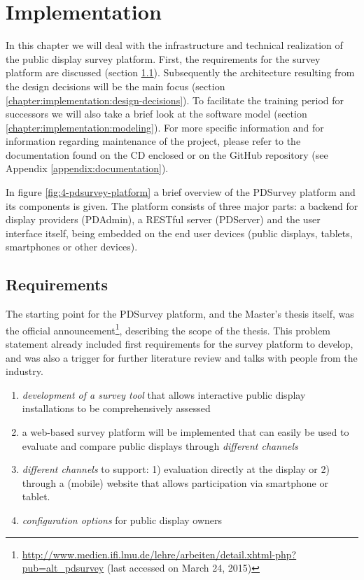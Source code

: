 \section{Implementation}
\label{chapter:implementation}

	In this chapter we will deal with the infrastructure and technical realization of the public display survey platform. First, the requirements for the survey platform are discussed (section \ref{chapter:implementation:requirements}). Subsequently the architecture resulting from the design decisions will be the main focus (section \ref{chapter:implementation:design-decisions}). To facilitate the training period for successors we will also take a brief look at the software model (section \ref{chapter:implementation:modeling}). For more specific information and for information regarding maintenance of the project, please refer to the documentation found on the CD enclosed or on the GitHub repository (see Appendix \ref{appendix:documentation}).

	In figure \ref{fig:4-pdsurvey-platform} a brief overview of the PDSurvey platform and its components is given. The platform consists of three major parts: a backend for display providers (PDAdmin), a RESTful server (PDServer) and the user interface itself, being embedded on the end user devices (public displays, tablets, smartphones or other devices). 





\subsection{Requirements}
\label{chapter:implementation:requirements}

	The starting point for the PDSurvey platform, and the Master's thesis itself, was the official announcement\footnote{\url{http://www.medien.ifi.lmu.de/lehre/arbeiten/detail.xhtml-php?pub=alt_pdsurvey} (last accessed on March 24, 2015)}, describing the scope of the thesis. This problem statement already included first requirements for the survey platform to develop, and was also a trigger for further literature review and talks with people from the industry.

	\begin{enumerate}[itemsep=0pt] 
	\item \textit{development of a survey tool} that allows interactive public display installations to be comprehensively assessed 
	\item a web-based survey platform will be implemented that can easily be used to evaluate and compare public displays through \textit{different channels} 
	\item \textit{different channels} to support: 1) evaluation directly at
	the display or 2) through a (mobile) website that allows participation via smartphone or tablet.
	\item \textit{configuration options} for public display owners
	\end{enumerate}


